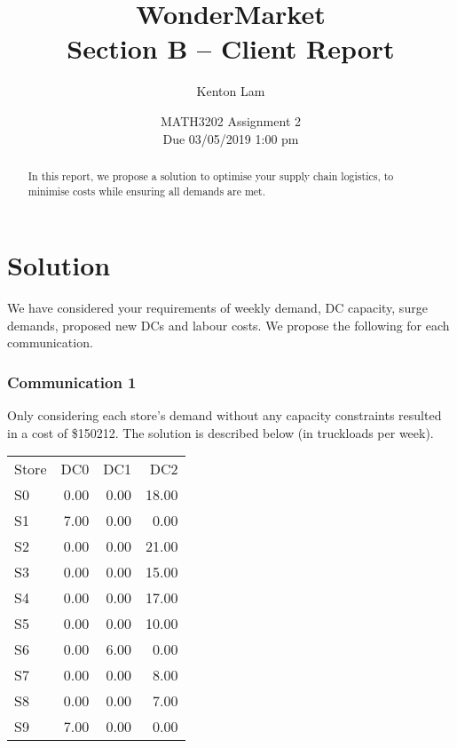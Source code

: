 \documentclass[11pt,a4paper]{article}
\author{Kenton Lam}
\date{{MATH3202 Assignment 2 \\ Due 03/05/2019 1:00 pm}}
\title{WonderMarket \\ 
Section B -- Client Report}
\begin{document}
\maketitle
\begin{abstract}
    In this report, we propose a solution to optimise your supply chain logistics, 
    to minimise costs while ensuring all demands are met.
\end{abstract}

\part{Solution}
We have considered your requirements of weekly demand, DC capacity, surge demands, 
proposed new DCs and labour costs.
We propose the following  for each communication.

\section{Communication 1}
Only considering each store's demand without any capacity constraints 
resulted in a cost of \$150212. The solution is described below (in truckloads per week). \\[0.8em]
\begin{tabular}{l  r  r  r }
    Store & DC0 & DC1 & DC2 \\
    S0 & 0.00 & 0.00 & 18.00 \\
    S1 & 7.00 & 0.00 & 0.00 \\
    S2 & 0.00 & 0.00 & 21.00 \\
    S3 & 0.00 & 0.00 & 15.00 \\
    S4 & 0.00 & 0.00 & 17.00 \\
    S5 & 0.00 & 0.00 & 10.00 \\
    S6 & 0.00 & 6.00 & 0.00 \\
    S7 & 0.00 & 0.00 & 8.00 \\
    S8 & 0.00 & 0.00 & 7.00 \\
    S9 & 7.00 & 0.00 & 0.00 \\    
\end{tabular}
\pagebreak
\end{document}
